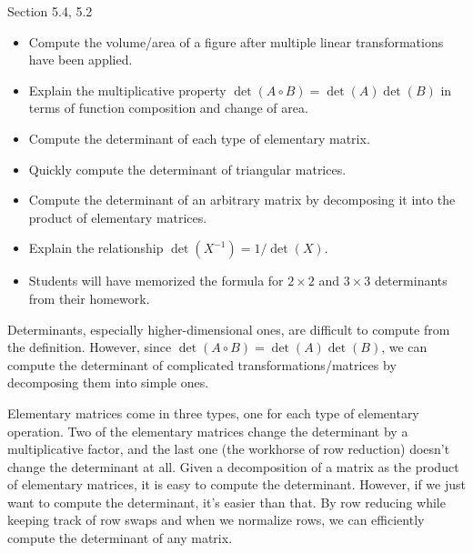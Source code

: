 \begin{lesson}

	Section 5.4, 5.2

	\begin{itemize}
		\item Compute the volume/area of a figure after multiple linear transformations
			have been applied.
		\item Explain the multiplicative property $\det(A\circ B)=\det(A)\det(B)$ in terms
			of function composition and change of area.
		\item Compute the determinant of each type of elementary matrix.
		\item Quickly compute the determinant of triangular matrices.
		\item Compute the determinant of an arbitrary matrix by decomposing it into the product of elementary matrices.
		\item Explain the relationship $\det(X^{-1})=1/\det(X)$.
	\end{itemize}

	\begin{annotation}
		\begin{notes}
			\begin{itemize}
				\item Students will have memorized the formula for $2\times 2$ and $3\times 3$ determinants
					from their homework.
			\end{itemize}
		\end{notes}
	\end{annotation}
	Determinants, especially higher-dimensional ones, are difficult to compute from the definition. However,
	since $\det(A\circ B)=\det(A)\det(B)$, we can compute the determinant of complicated transformations/matrices
	by decomposing them into simple ones.

	Elementary matrices come in three types, one for each type of elementary operation. Two of the elementary
	matrices change the determinant by a multiplicative factor, and the last one (the workhorse of row reduction) doesn't
	change the determinant at all. Given a decomposition of a matrix as the product of elementary matrices,
	it is easy to compute the determinant. However, if we just want to compute the determinant, it's easier than that.
	By row reducing while keeping track of row swaps and when
	we normalize rows, we can efficiently compute the determinant of any matrix.


\end{lesson}
